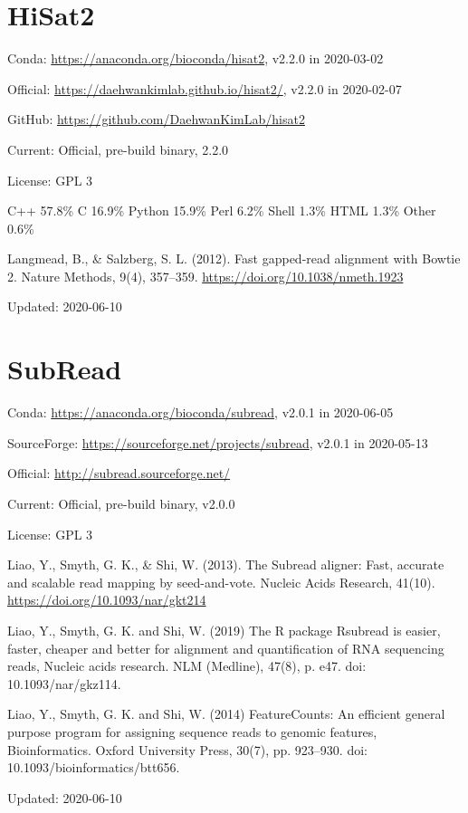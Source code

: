 \documentclass[]{article}
\begin{document}
\section{HiSat2}

Conda: \url{https://anaconda.org/bioconda/hisat2}, v2.2.0 in 2020-03-02

Official: \url{https://daehwankimlab.github.io/hisat2/}, v2.2.0 in 2020-02-07

GitHub: \url{https://github.com/DaehwanKimLab/hisat2}

Current: Official, pre-build binary, 2.2.0

License: GPL 3

C++ 57.8\% C 16.9\% Python 15.9\% Perl 6.2\% Shell 1.3\% HTML 1.3\% Other 0.6\%

Langmead, B., \& Salzberg, S. L. (2012). Fast gapped-read alignment with Bowtie 2. Nature Methods, 9(4), 357–359. \url{https://doi.org/10.1038/nmeth.1923}

Updated: 2020-06-10


\section{SubRead}

Conda: \url{https://anaconda.org/bioconda/subread}, v2.0.1 in 2020-06-05

SourceForge: \url{https://sourceforge.net/projects/subread}, v2.0.1 in 2020-05-13

Official: \url{http://subread.sourceforge.net/}

Current: Official, pre-build binary, v2.0.0

License: GPL 3

Liao, Y., Smyth, G. K., \& Shi, W. (2013). The Subread aligner: Fast, accurate and scalable read mapping by seed-and-vote. Nucleic Acids Research, 41(10). \url{https://doi.org/10.1093/nar/gkt214}

Liao, Y., Smyth, G. K. and Shi, W. (2019) The R package Rsubread is easier, faster, cheaper and better for alignment and quantification of RNA sequencing reads, Nucleic acids research. NLM (Medline), 47(8), p. e47. doi: 10.1093/nar/gkz114.

Liao, Y., Smyth, G. K. and Shi, W. (2014) FeatureCounts: An efficient general purpose program for assigning sequence reads to genomic features, Bioinformatics. Oxford University Press, 30(7), pp. 923–930. doi: 10.1093/bioinformatics/btt656.

Updated: 2020-06-10
\end{document}
